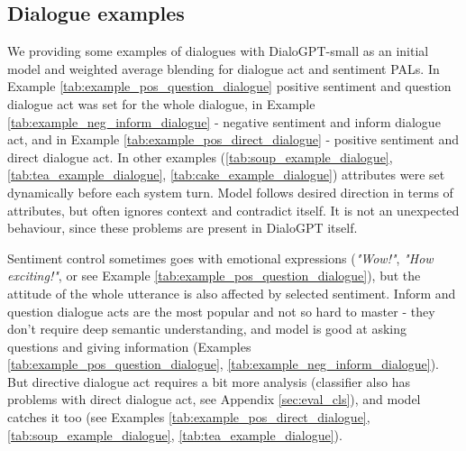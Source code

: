 \documentclass[11pt]{article}
\begin{document}
\subsection{Dialogue examples}
\label{sec:dialogue_examples}

We providing some examples of dialogues with DialoGPT-small as an initial model and weighted average blending for dialogue act and sentiment PALs. In Example \ref{tab:example_pos_question_dialogue} positive sentiment and question dialogue act was set for the whole dialogue, in Example \ref{tab:example_neg_inform_dialogue} - negative sentiment and inform dialogue act, and in Example \ref{tab:example_pos_direct_dialogue} - positive sentiment and direct dialogue act. In other examples (\ref{tab:soup_example_dialogue}, \ref{tab:tea_example_dialogue}, \ref{tab:cake_example_dialogue}) attributes were set dynamically before each system turn. Model follows desired direction in terms of attributes, but often ignores context and contradict itself. It is not an unexpected behaviour, since these problems are present in DialoGPT itself.

Sentiment control sometimes goes with emotional expressions (\textit{"Wow!"}, \textit{"How exciting!"}, or see Example \ref{tab:example_pos_question_dialogue}), but the attitude of the whole utterance is also affected by selected sentiment. Inform and question dialogue acts are the most popular and not so hard to master - they don't require deep semantic understanding, and model is good at asking questions and giving information (Examples \ref{tab:example_pos_question_dialogue}, \ref{tab:example_neg_inform_dialogue}). But directive dialogue act requires a bit more analysis (classifier also has problems with direct dialogue act, see Appendix \ref{sec:eval_cls}), and model catches it too (see Examples \ref{tab:example_pos_direct_dialogue}, \ref{tab:soup_example_dialogue}, \ref{tab:tea_example_dialogue}). 
\end{document}

